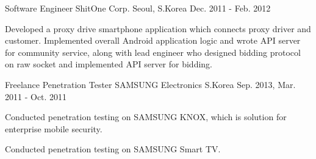 \begin{cventries}
  \cventry
    {Software Engineer} %
    {ShitOne Corp.} %
    {Seoul, S.Korea} %
    {Dec. 2011 - Feb. 2012} %
    {
      \begin{cvitems} %
        \item {Developed a proxy drive smartphone application which connects proxy driver and customer. Implemented overall Android application logic and wrote API server for community service, along with lead engineer who designed bidding protocol on raw socket and implemented API server for bidding.}
      \end{cvitems}
    }

  \cventry
    {Freelance Penetration Tester} %
    {SAMSUNG Electronics} %
    {S.Korea} %
    {Sep. 2013, Mar. 2011 - Oct. 2011} %
    {
      \begin{cvitems} %
        \item {Conducted penetration testing on SAMSUNG KNOX, which is solution for enterprise mobile security.}
        \item {Conducted penetration testing on SAMSUNG Smart TV.}
      \end{cvitems}
    }

\end{cventries}
